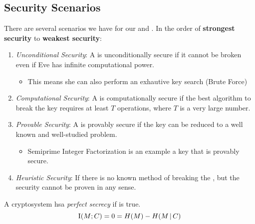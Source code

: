 \subsection{Security Scenarios}\label{subsec:Shannon_Security_Scenarios}
There are several scenarios we have for our  and .
In the order of \textbf{strongest security} to \textbf{weakest security}:
\begin{enumerate}[noitemsep]
\item \emph{Unconditional Security}: A  is unconditionally secure if it cannot be broken even if Eve has infinite computational power.
  \begin{itemize}[noitemsep]
  \item This means she can also perform an exhautive key search (Brute Force)
  \end{itemize}
\item \emph{Computational Security}: A  is computationally secure if the best algorithm to break the key requires at least $T$ operations, where $T$ is a very large number.
\item \emph{Provable Security}: A  is provably secure if the key can be reduced to a well known and well-studied problem.
  \begin{itemize}[noitemsep]
  \item Semiprime Integer Factorization is an example a key that is provably secure.
  \end{itemize}
\item \emph{Heuristic Security}: If there is no known method of breaking the , but the security cannot be proven in any sense.
\end{enumerate}

\begin{definition}\label{def:Perfect_Secrecy}
  A cryptosystem hsa \emph{perfect secrecy} if  is true.
  \begin{equation}\label{eq:Perfect_Secrecy}
    \operatorname{\operatorname{I}}(M;C) = 0 = H(M) - H(M \operatorname{\vert} C)
  \end{equation}
\end{definition}
